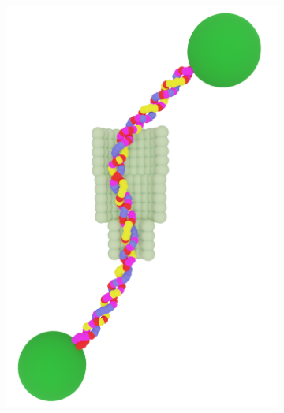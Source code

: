 \begin{figure}[ht]
\begin{centering}
\begin{subfigure}[t]{\dimexpr.5\linewidth-1.3em\relax}
  \end{subfigure}%
  \begin{subfigure}[t]{\dimexpr.21\linewidth-1.3em\relax}
  \centering
  \vspace{0.3cm}
  \includegraphics[width=\linewidth,valign=t]{Figures/Rotaxane-100.png}
  \end{subfigure}
  \label{fig:test}
  \end{centering}

  \vspace{0.01cm}


\end{figure}
